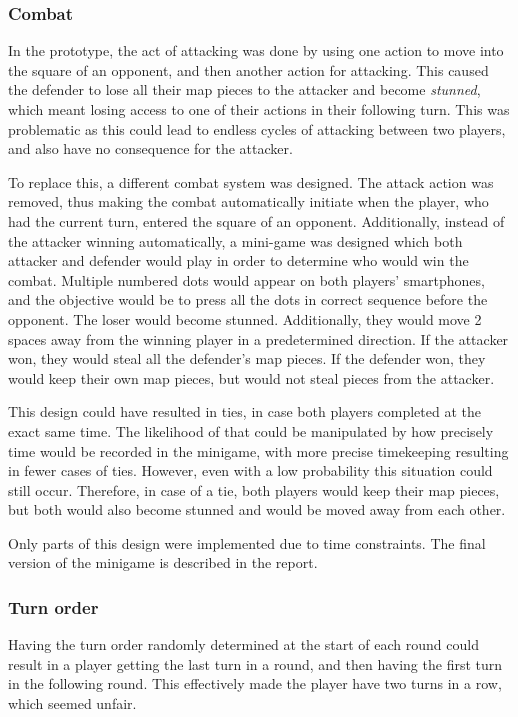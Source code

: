 \subsubsection{Combat}
In the prototype, the act of attacking was done by using one action to move into the square of an opponent, and then another action for attacking. This caused the defender to lose all their map pieces to the attacker and become \textit{stunned}, which meant losing access to one of their actions in their following turn. This was problematic as this could lead to endless cycles of attacking between two players, and also have no consequence for the attacker.

To replace this, a different combat system was designed. The attack action was removed, thus making the combat automatically initiate when the player, who had the current turn, entered the square of an opponent. Additionally, instead of the attacker winning automatically, a mini-game was designed which both attacker and defender would play in order to determine who would win the combat. Multiple numbered dots would appear on both players’ smartphones, and the objective would be to press all the dots in correct sequence before the opponent. The loser would become stunned. Additionally, they would move 2 spaces away from the winning player in a predetermined direction. If the attacker won, they would steal all the defender’s map pieces. If the defender won, they would keep their own map pieces, but would not steal pieces from the attacker.

This design could have resulted in ties, in case both players completed at the exact same time. The likelihood of that could be manipulated by how precisely time would be recorded in the minigame, with more precise timekeeping resulting in fewer cases of ties. However, even with a low probability this situation could still occur. Therefore, in case of a tie, both players would keep their map pieces, but both would also become stunned and would be moved away from each other.

Only parts of this design were implemented due to time constraints. The final version of the minigame is described in the report.

\subsubsection{Turn order}
Having the turn order randomly determined at the start of each round could result in a player getting the last turn in a round, and then having the first turn in the following round. This effectively made the player have two turns in a row, which seemed unfair.

